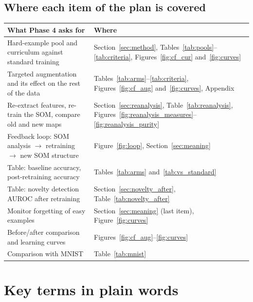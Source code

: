\documentclass[11pt]{article}
\begin{document}
\subsection*{Where each item of the plan is covered}

{\small
\renewcommand{\arraystretch}{1.12}
\begin{tabularx}{\textwidth}{|>{\raggedright\arraybackslash}p{}|X|}
\hline
\textbf{What Phase 4 asks for} & \textbf{Where} \\ \hline
Hard-example pool and curriculum against standard training & Section~\ref{sec:method}, Tables~\ref{tab:pools}--\ref{tab:criteria}, Figures~\ref{fig:cf_cur} and~\ref{fig:curves} \\ \hline
Targeted augmentation and its effect on the rest of the data & Tables~\ref{tab:arms}--\ref{tab:criteria}, Figures~\ref{fig:cf_aug} and~\ref{fig:curves}, Appendix \\ \hline
Re-extract features, re-train the SOM, compare old and new maps & Section~\ref{sec:reanalysis}, Table~\ref{tab:reanalysis}, Figures~\ref{fig:reanalysis_measures}--\ref{fig:reanalysis_purity} \\ \hline
Feedback loop: SOM analysis $\rightarrow$ retraining $\rightarrow$ new SOM structure & Figure~\ref{fig:loop}, Section~\ref{sec:meaning} \\ \hline
Table: baseline accuracy, post-retraining accuracy & Tables~\ref{tab:arms} and~\ref{tab:vs_standard} \\ \hline
Table: novelty detection AUROC after retraining & Section~\ref{sec:novelty_after}, Table~\ref{tab:novelty_after} \\ \hline
Monitor forgetting of easy examples & Section~\ref{sec:meaning} (last item), Figure~\ref{fig:curves} \\ \hline
Before/after comparison and learning curves & Figures~\ref{fig:cf_aug}--\ref{fig:curves} \\ \hline
Comparison with MNIST & Table~\ref{tab:mnist} \\ \hline
\end{tabularx}}

\section{Key terms in plain words}
\end{document}
